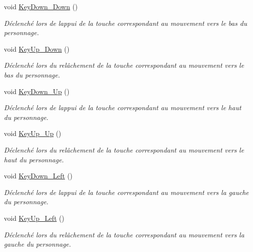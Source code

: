 \begin{DoxyCompactItemize}
void \hyperlink{class_tentacle_slicers_1_1actors_1_1_player_character_a88a4c15c5bafbdca5b80544f278c4966}{Key\+Down\+\_\+\+Down} ()
\begin{DoxyCompactList}\small\item\em Déclenché lors de l\textquotesingle{}appui de la touche correspondant au mouvement vers le bas du personnage. \end{DoxyCompactList}\item 
void \hyperlink{class_tentacle_slicers_1_1actors_1_1_player_character_a7c674d55517b678e1ef3e56eef87020b}{Key\+Up\+\_\+\+Down} ()
\begin{DoxyCompactList}\small\item\em Déclenché lors du relâchement de la touche correspondant au mouvement vers le bas du personnage. \end{DoxyCompactList}\item 
void \hyperlink{class_tentacle_slicers_1_1actors_1_1_player_character_accd59fed83e91a191e78ef1db45688db}{Key\+Down\+\_\+\+Up} ()
\begin{DoxyCompactList}\small\item\em Déclenché lors de l\textquotesingle{}appui de la touche correspondant au mouvement vers le haut du personnage. \end{DoxyCompactList}\item 
void \hyperlink{class_tentacle_slicers_1_1actors_1_1_player_character_a4d847691e46394ff398a4df2297c442b}{Key\+Up\+\_\+\+Up} ()
\begin{DoxyCompactList}\small\item\em Déclenché lors du relâchement de la touche correspondant au mouvement vers le haut du personnage. \end{DoxyCompactList}\item 
void \hyperlink{class_tentacle_slicers_1_1actors_1_1_player_character_abf33ac13bbb9485e1692c1fe603d9c5e}{Key\+Down\+\_\+\+Left} ()
\begin{DoxyCompactList}\small\item\em Déclenché lors de l\textquotesingle{}appui de la touche correspondant au mouvement vers la gauche du personnage. \end{DoxyCompactList}\item 
void \hyperlink{class_tentacle_slicers_1_1actors_1_1_player_character_a84e49238e717a5758a16482b728f7863}{Key\+Up\+\_\+\+Left} ()
\begin{DoxyCompactList}\small\item\em Déclenché lors du relâchement de la touche correspondant au mouvement vers la gauche du personnage. \end{DoxyCompactList}\item 

\end{DoxyCompactItemize}

